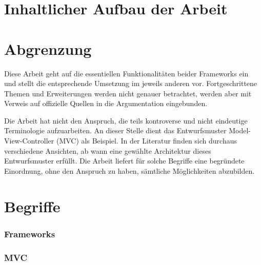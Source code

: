 \section{Inhaltlicher Aufbau der Arbeit}

\section{Abgrenzung}

Diese Arbeit geht auf die essentiellen Funktionalitäten beider Frameworks ein und stellt die entsprechende Umsetzung im jeweils
anderen vor. Fortgeschrittene Themen und Erweiterungen werden nicht genauer betrachtet, werden aber mit Verweis auf offizielle Quellen
in die Argumentation eingebunden.

Die Arbeit hat nicht den Anspruch, die teils kontroverse und nicht eindeutige Terminologie aufzuarbeiten. An dieser Stelle dient das Entwurfsmuster Model-View-Controller (MVC) als Beispiel. In der Literatur finden sich durchaus verschiedene Ansichten, ab wann eine gewählte Architektur dieses Entwurfsmuster erfüllt. Die Arbeit liefert für solche Begriffe eine begründete Einordnung, ohne den Anspruch zu haben, sämtliche Möglichkeiten abzubilden.

\section{Begriffe}
\subsubsection{Frameworks}
\subsubsection{MVC}
